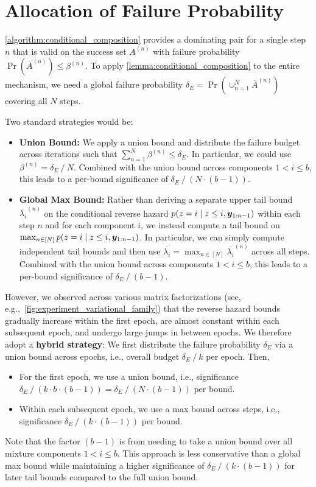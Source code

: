 \clearpage
\section{Allocation of Failure Probability}\label{appendix:significance_allocation}
\cref{algorithm:conditional_composition} provides a dominating pair for a single step $n$ that is valid on the success set $A^{(n)}$ with failure probability $\Pr(\overline{A}^{(n)}) \le \beta^{(n)}$. To apply \cref{lemma:conditional_composition} to the entire mechanism, we need a global failure probability $\delta_E = \Pr(\cup_{n=1}^N \overline{A}^{(n)})$ covering all $N$ steps. 

Two standard strategies would be:
\begin{itemize}[noitemsep]
    \item \textbf{Union Bound:} We apply a union bound and distribute the failure budget across iterations such that $\sum_{n=1}^N \beta^{(n)} \le \delta_E$. In particular, we could use $\beta^{(n)} = \delta_E \mathbin{/} N$.
    Combined with the union bound across components $1 < i \leq b$, this leads to a per-bound significance of $\delta_E   \mathbin{/} (N \cdot (b-1))$.
    \item \textbf{Global Max Bound:} Rather than deriving a separate upper tail bound $\overline{\lambda_i}^{(n)}$ on the conditional reverse hazard $p(z = i \mid z \leq i, {\bm{y}}_{1:n-1})$ within each step $n$ and for each component $i$, we instead compute a tail bound on
    $\max_{n \in [N]} p(z = i \mid z \leq i, {\bm{y}}_{1:n-1})$. In particular, we can simply compute independent
    tail bounds and then use $\overline{\lambda_i} = \max_{n \in [N]} \overline{\lambda_i}^{(n)}$ across all steps.
    Combined with the union bound across components $1 < i \leq b$, this leads to a per-bound significance of $\delta_E   \mathbin{/} (b-1)$.
\end{itemize}

However, we observed across various matrix factorizations (see, e.g.,~\cref{fig:experiment_variational_family}) that the reverse hazard bounds
gradually increase within the first epoch, are almost constant within each subsequent epoch, and undergo large jumps in between epochs.
We therefore adopt a \textbf{hybrid strategy}:
We first distribute the failure probability $\delta_E$ via a union bound across epochs, i.e., overall budget $\delta_E \mathbin{/} k$ per epoch. Then, 
\begin{itemize}
    \item For the first epoch, we use a union bound, i.e., significance $\delta_E \mathbin{/} (k \cdot b \cdot (b-1)) = \delta_E \mathbin{/} (N \cdot (b-1))$ per bound.
    \item Within each subsequent epoch, we use a max bound across steps, i.e., significance $\delta_E \mathbin{/} (k \cdot (b-1))$ per bound. 
\end{itemize}
Note that the factor $(b-1)$ is from needing to take a union bound over all mixture components $1 < i \leq b$.
This approach is less conservative than a global max  bound while maintaining a higher significance of $\delta_E \mathbin{/} (k \cdot (b-1))$ for later tail bounds compared to the full  union bound.

